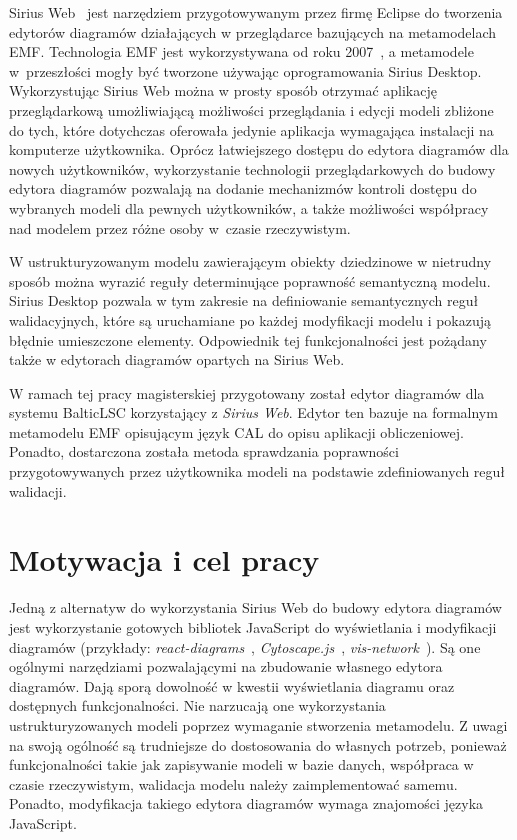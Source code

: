 Sirius Web~\cite{sirius-web-github} jest narzędziem przygotowywanym przez firmę
Eclipse do tworzenia edytorów
diagramów działających w przeglądarce bazujących na metamodelach \gls{EMF}.
Technologia \gls{EMF} jest wykorzystywana od roku
2007~\cite{eclipse-sirius-wikipedia}, a metamodele
w~przeszłości mogły być tworzone używając oprogramowania Sirius
Desktop. Wykorzystując Sirius Web można w prosty sposób otrzymać aplikację
przeglądarkową umożliwiającą możliwości przeglądania i edycji modeli zbliżone
do tych,
które dotychczas oferowała jedynie aplikacja wymagająca instalacji na
komputerze użytkownika. Oprócz łatwiejszego dostępu do edytora diagramów dla
nowych użytkowników, wykorzystanie technologii przeglądarkowych do budowy
edytora diagramów pozwalają na dodanie mechanizmów kontroli dostępu do
wybranych modeli dla pewnych użytkowników, a także możliwości współpracy nad
modelem przez różne osoby w~czasie rzeczywistym.

W ustrukturyzowanym modelu zawierającym obiekty dziedzinowe w nietrudny sposób
można wyrazić reguły determinujące poprawność semantyczną modelu. Sirius
Desktop pozwala w tym zakresie na definiowanie semantycznych reguł
walidacyjnych, które są uruchamiane po każdej modyfikacji modelu i pokazują
błędnie umieszczone elementy. Odpowiednik tej funkcjonalności jest pożądany
także w edytorach diagramów opartych na Sirius Web.

W ramach tej pracy magisterskiej przygotowany został edytor diagramów dla
systemu BalticLSC korzystający z \emph{Sirius Web}. Edytor ten bazuje na
formalnym metamodelu \gls{EMF} opisującym język \gls{CAL} do
opisu aplikacji obliczeniowej. Ponadto, dostarczona została metoda sprawdzania
poprawności przygotowywanych przez użytkownika modeli na podstawie
zdefiniowanych reguł walidacji.

\section{Motywacja i cel pracy}

Jedną z alternatyw do wykorzystania Sirius Web do budowy edytora diagramów jest
wykorzystanie gotowych bibliotek JavaScript do wyświetlania i modyfikacji
diagramów (przykłady: \emph{react-diagrams}~\cite{react-diagrams-github},
\emph{Cytoscape.js}~\cite{cytoscape-js-homepage},
\emph{vis-network}~\cite{vis-network-github}). Są one ogólnymi narzędziami
pozwalającymi na zbudowanie własnego edytora diagramów. Dają sporą dowolność w
kwestii wyświetlania diagramu oraz
dostępnych funkcjonalności. Nie narzucają one
wykorzystania ustrukturyzowanych modeli poprzez wymaganie stworzenia
metamodelu. Z uwagi na swoją ogólność są trudniejsze do dostosowania do
własnych potrzeb, ponieważ funkcjonalności takie jak zapisywanie modeli w bazie
danych, współpraca w czasie rzeczywistym, walidacja modelu należy
zaimplementować samemu. Ponadto, modyfikacja takiego edytora diagramów wymaga
znajomości języka JavaScript.

